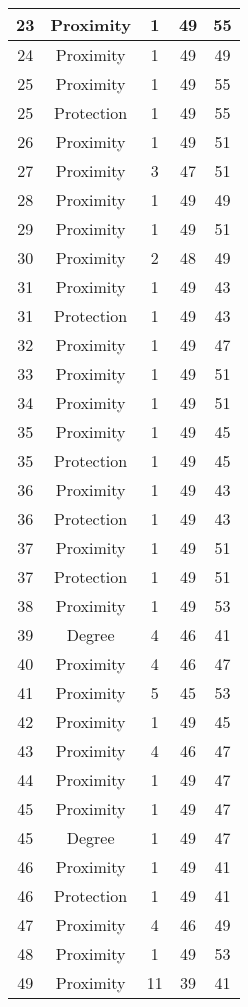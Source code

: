 \documentclass[results.tex]{subfiles}
\begin{document}
\begin{center}
\begin{tabular}{| c || c | c | c | c |}
    \hline
    23 & Proximity & 1 & 49 & 55 \\ 
    \hline
    24 & Proximity & 1 & 49 & 49 \\ 
    \hline
    25 & Proximity & 1 & 49 & 55 \\ 
    \hline
    25 & Protection & 1 & 49 & 55 \\ 
    \hline
    26 & Proximity & 1 & 49 & 51 \\ 
    \hline
    27 & Proximity & 3 & 47 & 51 \\ 
    \hline
    28 & Proximity & 1 & 49 & 49 \\ 
    \hline
    29 & Proximity & 1 & 49 & 51 \\ 
    \hline
    30 & Proximity & 2 & 48 & 49 \\ 
    \hline
    31 & Proximity & 1 & 49 & 43 \\ 
    \hline
    31 & Protection & 1 & 49 & 43 \\ 
    \hline
    32 & Proximity & 1 & 49 & 47 \\ 
    \hline
    33 & Proximity & 1 & 49 & 51 \\ 
    \hline
    34 & Proximity & 1 & 49 & 51 \\ 
    \hline
    35 & Proximity & 1 & 49 & 45 \\ 
    \hline
    35 & Protection & 1 & 49 & 45 \\ 
    \hline
    36 & Proximity & 1 & 49 & 43 \\ 
    \hline
    36 & Protection & 1 & 49 & 43 \\ 
    \hline
    37 & Proximity & 1 & 49 & 51 \\ 
    \hline
    37 & Protection & 1 & 49 & 51 \\ 
    \hline
    38 & Proximity & 1 & 49 & 53 \\ 
    \hline
    39 & Degree & 4 & 46 & 41 \\ 
    \hline
    40 & Proximity & 4 & 46 & 47 \\ 
    \hline
    41 & Proximity & 5 & 45 & 53 \\ 
    \hline
    42 & Proximity & 1 & 49 & 45 \\ 
    \hline
    43 & Proximity & 4 & 46 & 47 \\ 
    \hline
    44 & Proximity & 1 & 49 & 47 \\ 
    \hline
    45 & Proximity & 1 & 49 & 47 \\ 
    \hline
    45 & Degree & 1 & 49 & 47 \\ 
    \hline
    46 & Proximity & 1 & 49 & 41 \\ 
    \hline
    46 & Protection & 1 & 49 & 41 \\ 
    \hline
    47 & Proximity & 4 & 46 & 49 \\ 
    \hline
    48 & Proximity & 1 & 49 & 53 \\ 
    \hline
    49 & Proximity & 11 & 39 & 41 \\ 
    \hline   \end{tabular}
\end{center}
\end{document}
